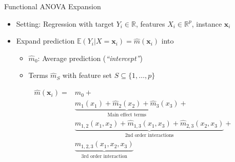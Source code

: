 \documentclass[aspectratio=169,12pt]{beamer}
\providecommand{\tightlist}{%
  \setlength{\itemsep}{2pt}\setlength{\parskip}{0pt}}
\begin{document}
\begin{frame}{Functional ANOVA Expansion}
\label{functional-anova-expansion}
\begin{itemize}[<+->]
\tightlist
\item
  Setting: Regression with target \(Y_i \in \mathbb{R}\), features
  \(X_i \in \mathbb{R}^p\), instance \(\mathbf{x}_i\)
\item
  Expand prediction
  \(\mathbb{E}(Y_i | X = \mathbf{x}_i) = \hat{m}(\mathbf{x}_i)\) into

  \begin{itemize}[<+->]
  \tightlist
  \item
    \(\hat{m}_{0}\): Average prediction (\emph{``intercept''})
  \item
    Terms \(\hat{m}_S\) with feature set
    \(S \subseteq \{1, \ldots, p\}\)
  \end{itemize}
\end{itemize}

\pause

\begin{align*}
\hat{m}(\mathbf{x}_i) = & \hat{m}_{0} + \\
&  \underbrace{\hat{m}_1(x_1) + \hat{m}_2(x_2) + \hat{m}_3(x_3)}_{\text{Main effect terms}} + \\
&  \underbrace{\hat{m}_{1,2}(x_1,x_2) + \hat{m}_{1,3}(x_1,x_3) + \hat{m}_{2,3}(x_2,x_3)}_{\text{2nd order interactions}} + \\ 
&  \underbrace{\hat{m}_{1,2,3}(x_1,x_2,x_3)}_{\text{3rd order interaction}}
\end{align*}
\end{frame}
\end{document}
